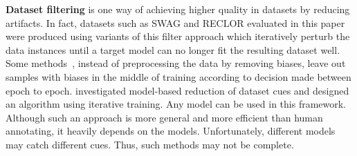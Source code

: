 \textbf{Dataset filtering} is one way of achieving
higher quality in datasets by reducing artifacts. 
In fact, datasets such as SWAG and RECLOR evaluated in this paper
were produced using variants of this filter approach which 
iteratively perturb the data instances until a target 
model can no longer fit the resulting dataset well. 
Some methods~\cite{yaghoobzadeh2019robust}, instead of preprocessing
the data by removing biases, leave out samples with biases 
in the middle of training according to decision made between 
epoch to epoch. \citealp{bras2020adversarial} investigated 
model-based reduction of dataset cues and designed an algorithm 
using iterative training. Any model can be used in 
this framework. Although such an approach is more 
general and more efficient than human annotating, 
it heavily depends on the models. Unfortunately, different models
may catch different cues. Thus, such methods may not be complete.





